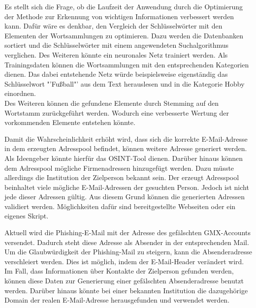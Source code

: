 Es stellt sich die Frage, ob die Laufzeit der Anwendung durch die Optimierung der Methode zur Erkennung von wichtigen Informationen verbessert werden kann. Dafür wäre es denkbar, den Vergleich der Schlüsselwörter mit den Elementen der Wortsammlungen zu optimieren. Dazu werden die Datenbanken sortiert und die Schlüsselwörter mit einem angewendeten Suchalgorithmus verglichen. Des Weiteren könnte ein neuronales Netz trainiert werden. Als Trainingsdaten können die Wortsammlungen mit den entsprechenden Kategorien dienen. Das dabei entstehende Netz würde beispielsweise eigenständig das Schlüsselwort "'Fußball"' aus dem Text herauslesen und in die Kategorie Hobby einordnen. \\
Des Weiteren können die gefundene Elemente durch Stemming auf den Wortstamm zurückgeführt werden. Wodurch eine verbesserte Wertung der vorkommenden Elemente entstehen könnte.

Damit die Wahrscheinlichkeit erhöht wird, dass sich die korrekte E-Mail-Adresse in dem erzeugten Adresspool befindet, können weitere Adresse generiert werden. Als Ideengeber könnte hierfür das OSINT-Tool \cite{EmailAssumptions} dienen. Darüber hinaus können dem Adresspool mögliche Firmenadressen hinzugefügt werden. Dazu müsste allerdings die Institution der Zielperson bekannt sein. Der erzeugt Adresspool beinhaltet viele mögliche E-Mail-Adressen der gesuchten Person. Jedoch ist nicht jede dieser Adressen gültig. Aus diesem Grund können die generierten Adressen validiert werden. Möglichkeiten dafür sind bereitgestellte Webseiten oder ein eigenes Skript.

Aktuell wird die Phishing-E-Mail mit der Adresse des gefälschten GMX-Accounts versendet. Dadurch steht diese Adresse als Absender in der entsprechenden Mail. Um die Glaubwürdigkeit der Phishing-Mail zu steigern, kann die Absenderadresse verschleiert werden. Dies ist möglich, indem der E-Mail-Header verändert wird. Im Fall, dass Informationen über Kontakte der Zielperson gefunden werden, können diese Daten zur Generierung einer gefälschten Absenderadresse benutzt werden. Darüber hinaus könnte bei einer bekannten Institution die dazugehörige Domain der realen E-Mail-Adresse herausgefunden und verwendet werden.

